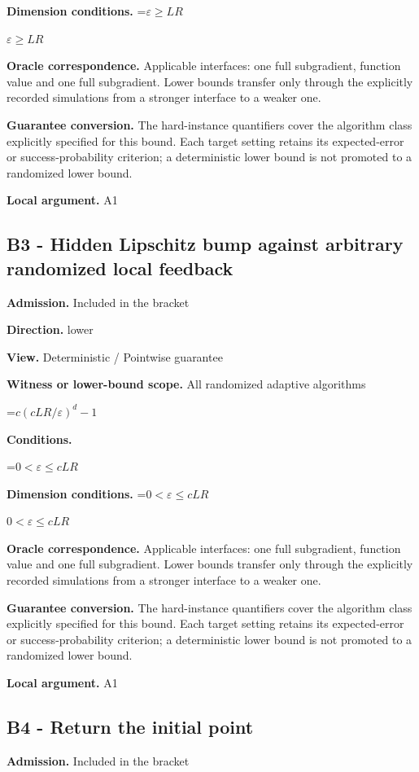 \documentclass[10pt,a4paper]{article}
\newcommand{\AtlasMath}[1]{\par\begingroup\centering\setbox0=\hbox{$\displaystyle #1$}\ifdim\wd0>1.4\linewidth\typeout{ATLAS WIDE FORMULA: \the\wd0}\fi\ifdim\wd0>\linewidth\resizebox{\linewidth}{!}{\box0}\else\box0\fi\par\endgroup}
\newcommand{\AtlasInlineMath}[1]{\begingroup\setbox0=\hbox{$#1$}\ifdim\wd0>.4\linewidth\endgroup\AtlasMath{#1}\else\endgroup$#1$\fi}
\begin{document}
\textbf{Dimension conditions.} \AtlasInlineMath{\varepsilon\ge LR}

\textbf{Oracle correspondence.} Applicable interfaces: one full subgradient, function value and one full subgradient. Lower bounds transfer only through the explicitly recorded simulations from a stronger interface to a weaker one.

\textbf{Guarantee conversion.} The hard-instance quantifiers cover the algorithm class explicitly specified for this bound. Each target setting retains its expected-error or success-probability criterion; a deterministic lower bound is not promoted to a randomized lower bound.

\textbf{Local argument.} A1

\subsection{B3 - Hidden Lipschitz bump against arbitrary randomized local feedback}
\textbf{Admission.} Included in the bracket

\textbf{Direction.} lower

\textbf{View.} Deterministic / Pointwise guarantee

\textbf{Witness or lower-bound scope.} All randomized adaptive algorithms

\AtlasMath{c(cLR/\varepsilon)^d-1}
\textbf{Conditions.} 
\AtlasMath{0<\varepsilon\le cLR}


\textbf{Dimension conditions.} \AtlasInlineMath{0<\varepsilon\le cLR}

\textbf{Oracle correspondence.} Applicable interfaces: one full subgradient, function value and one full subgradient. Lower bounds transfer only through the explicitly recorded simulations from a stronger interface to a weaker one.

\textbf{Guarantee conversion.} The hard-instance quantifiers cover the algorithm class explicitly specified for this bound. Each target setting retains its expected-error or success-probability criterion; a deterministic lower bound is not promoted to a randomized lower bound.

\textbf{Local argument.} A1

\subsection{B4 - Return the initial point}
\textbf{Admission.} Included in the bracket
\end{document}
